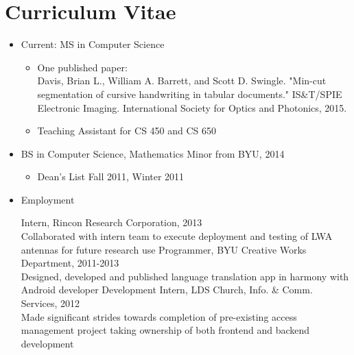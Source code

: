 \documentclass[conference]{IEEEtran}
\begin{document}




\newpage
\section{Curriculum Vitae}
\begin{itemize}
	\item Current: MS in Computer Science
	\begin{itemize}
		\item One published paper: \\
			Davis, Brian L., William A. Barrett, and Scott D. Swingle. "Min-cut segmentation of cursive handwriting in tabular documents." IS&T/SPIE Electronic Imaging. International Society for Optics and Photonics, 2015.
		\item Teaching Assistant for CS 450 and CS 650
	\end{itemize}
	\item BS in Computer Science, Mathematics Minor from BYU, 2014
	\begin{itemize}
		\item Dean's List Fall 2011, Winter 2011
	\end{itemize}
	\item Employment
	\begin{itemize}
		\iter Intern, Rincon Research Corporation, 2013 \\
			 Collaborated with intern team to execute deployment and testing of LWA antennas for future research use
		\iter Programmer, BYU Creative Works Department, 2011-2013 \\
			Designed, developed and published language translation app in harmony with Android developer
		\iter Development Intern, LDS Church, Info. & Comm. Services, 2012 \\
			Made significant strides towards completion of pre-existing access management project taking ownership of both frontend and backend development
	\end{itemize}
	
\end{itemize}

\newpage
\end{document}
